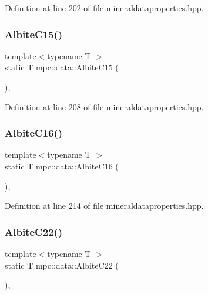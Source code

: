 Definition at line 202 of file mineraldataproperties.\+hpp.

\mbox{\label{namespacempc_1_1data_ae7a0765ecfa5c75d0ddb726d511abbbd}} 
\subsubsection{\texorpdfstring{Albite\+C15()}{AlbiteC15()}}
{\footnotesize\ttfamily template$<$typename T $>$ \\
static T mpc\+::data\+::\+Albite\+C15 (\begin{DoxyParamCaption}{ }\end{DoxyParamCaption})\hspace{0.3cm}{\ttfamily [inline]}, {\ttfamily [static]}}



Definition at line 208 of file mineraldataproperties.\+hpp.

\mbox{\label{namespacempc_1_1data_a128bf8536a395207cf279873aebf0380}} 
\subsubsection{\texorpdfstring{Albite\+C16()}{AlbiteC16()}}
{\footnotesize\ttfamily template$<$typename T $>$ \\
static T mpc\+::data\+::\+Albite\+C16 (\begin{DoxyParamCaption}{ }\end{DoxyParamCaption})\hspace{0.3cm}{\ttfamily [inline]}, {\ttfamily [static]}}



Definition at line 214 of file mineraldataproperties.\+hpp.

\mbox{\label{namespacempc_1_1data_a4e07e764265c2f09a8e556fad32c444d}} 
\subsubsection{\texorpdfstring{Albite\+C22()}{AlbiteC22()}}
{\footnotesize\ttfamily template$<$typename T $>$ \\
static T mpc\+::data\+::\+Albite\+C22 (\begin{DoxyParamCaption}{ }\end{DoxyParamCaption})\hspace{0.3cm}{\ttfamily [inline]}, {\ttfamily [static]}}



